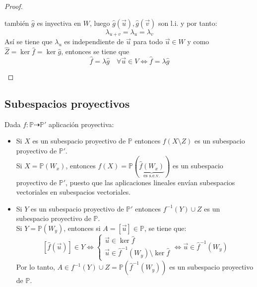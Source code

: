 \begin{proof}
\begin{itemize}
\begin{itemize}
\begin{itemize}
            también $\hat{g}$ es inyectiva en $W$, luego $\hat{g}(\vec{u}), \hat{g}(\vec{v})$ son l.i. y por tanto:
            \[
                \lambda_{u+v} = \lambda_u = \lambda_v
            \]
            Así se tiene que $\lambda_u$ es independiente de $\vec{u}$ para todo $\vec{u} \in W$ y como $\hat{Z} = \ker \hat{f} = \ker \hat{g}$, entonces se tiene que
            \[
                \hat{f} = \lambda \hat{g} \quad \forall \vec{u} \in V \iff \hat{f} = \lambda \hat{g} 
            \]
        \end{itemize}
        \end{itemize}
    \end{itemize}
\end{proof}

\subsection{Subespacios proyectivos}

Dada $f:\mathbb{P} \dashrightarrow \mathbb{P}'$ aplicación proyectiva:

\begin{itemize}
    \item Si $X$ es un subespacio proyectivo de $\mathbb{P}$ entonces $f(X \setminus Z)$ es un subespacio proyectivo de $\mathbb{P}'$.\\
    Si $X = \mathbb{P}(W_x)$, entonces $f(X) = \mathbb{P}(\underbrace{\hat{f}(W_x)}_{\text{es s.e.v.}})$ es un subespacio proyectivo de $\mathbb{P}'$, puesto que las aplicaciones lineales envían subespacios vectoriales en subespacios vectoriales.
    \item Si $Y$ es un subespacio proyectivo de $\mathbb{P}'$ entonces $f^{-1}(Y) \cup Z$ es un subespacio proyectivo de $\mathbb{P}$.\\
    Si $Y = \mathbb{P}(W_y)$, entonces si $A = [\vec{u}] \in \mathbb{P}$, se tiene que:
    \[
        [\hat{f}(\vec{u})] \in Y \iff \begin{cases}
            \vec{u} \in \ker \hat{f} \\
            \vec{u} \in \hat{f}^{-1}(W_y) \setminus \ker \hat{f}
        \end{cases} \iff \vec{u} \in \hat{f}^{-1}(W_y)
    \]
    Por lo tanto, $A \in f^{-1}(Y) \cup Z = \mathbb{P}(\hat{f}^{-1}(W_y))$ es un subespacio proyectivo de $\mathbb{P}$.
\end{itemize}


